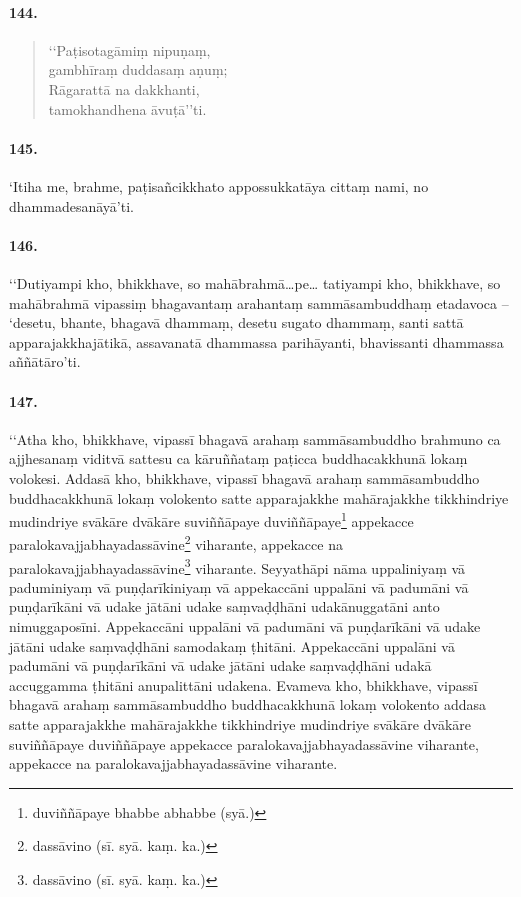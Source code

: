 \paragraph{144.}\begin{verse}
  ‘‘Paṭisotagāmiṃ nipuṇaṃ, \\gambhīraṃ duddasaṃ aṇuṃ;\\
  Rāgarattā na dakkhanti, \\tamokhandhena āvuṭā’’ti.
\end{verse}

\paragraph{145.} ‘Itiha me, brahme, paṭisañcikkhato appossukkatāya cittaṃ nami, no dhammadesanāyā’ti.

\paragraph{146.} ‘‘Dutiyampi kho, bhikkhave, so mahābrahmā…pe… tatiyampi kho, bhikkhave, so mahābrahmā vipassiṃ bhagavantaṃ arahantaṃ sammāsambuddhaṃ etadavoca – ‘desetu, bhante, bhagavā dhammaṃ, desetu sugato dhammaṃ, santi sattā apparajakkhajātikā, assavanatā dhammassa parihāyanti, bhavissanti dhammassa aññātāro’ti.

\paragraph{147.} ‘‘Atha kho, bhikkhave, vipassī bhagavā arahaṃ sammāsambuddho brahmuno ca ajjhesanaṃ viditvā sattesu ca kāruññataṃ paṭicca buddhacakkhunā lokaṃ volokesi. Addasā kho, bhikkhave, vipassī bhagavā arahaṃ sammāsambuddho buddhacakkhunā lokaṃ volokento satte apparajakkhe mahārajakkhe tikkhindriye mudindriye svākāre dvākāre suviññāpaye duviññāpaye\footnote{duviññāpaye bhabbe abhabbe (syā.)} appekacce paralokavajjabhayadassāvine\footnote{dassāvino (sī. syā. kaṃ. ka.)} viharante, appekacce na paralokavajjabhayadassāvine\footnote{dassāvino (sī. syā. kaṃ. ka.)} viharante. Seyyathāpi nāma uppaliniyaṃ vā paduminiyaṃ vā puṇḍarīkiniyaṃ vā appekaccāni uppalāni vā padumāni vā puṇḍarīkāni vā udake jātāni udake saṃvaḍḍhāni udakānuggatāni anto nimuggaposīni. Appekaccāni uppalāni vā padumāni vā puṇḍarīkāni vā udake jātāni udake saṃvaḍḍhāni samodakaṃ ṭhitāni. Appekaccāni uppalāni vā padumāni vā puṇḍarīkāni vā udake jātāni udake saṃvaḍḍhāni udakā accuggamma ṭhitāni anupalittāni udakena. Evameva kho, bhikkhave, vipassī bhagavā arahaṃ sammāsambuddho buddhacakkhunā lokaṃ volokento addasa satte apparajakkhe mahārajakkhe tikkhindriye mudindriye svākāre dvākāre suviññāpaye duviññāpaye appekacce paralokavajjabhayadassāvine viharante, appekacce na paralokavajjabhayadassāvine viharante.

